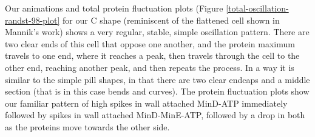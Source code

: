 \documentclass[letterpaper,twocolumn,amsmath,amssymb,pre]{revtex4-1}
\begin{document}
Our animations and total protein fluctuation plots (Figure
\ref{total-oscillation-randst-98-plot} for our C shape (reminiscent of
the flattened cell shown in Mannik's work) shows a very regular,
stable, simple oscillation pattern.  There are two clear ends of this
cell that oppose one another, and the protein maximum travels to one
end, where it reaches a peak, then travels through the cell to the
other end, reaching another peak, and then repeats the process.  In a
way it is similar to the simple pill shapes, in that there are two
clear endcaps and a middle section (that is in this case bends and
curves).  The protein fluctuation plots show our familiar pattern of
high spikes in wall attached MinD-ATP immediately followed by spikes
in wall attached MinD-MinE-ATP, followed by a drop in both as the
proteins move towards the other side.
\end{document}

